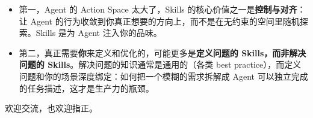 \begin{itemize}
  \item 第一，Agent 的 Action Space 太大了，Skills 的核心价值之一是\textbf{控制与对齐}：让 Agent 的行为收敛到你真正想要的方向上，而不是在无约束的空间里随机探索。Skills 是为 Agent 注入你的品味。
  \item 第二，真正需要\textbf{你}来定义和优化的，可能更多是\textbf{定义问题的 Skills，而非解决问题的 Skills}。解决问题的知识通常是通用的（各类 best practice），而定义问题和你的场景深度绑定：如何把一个模糊的需求拆解成 Agent 可以独立完成的任务描述，这才是生产力的瓶颈。
\end{itemize}

欢迎交流，也欢迎指正。
